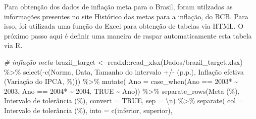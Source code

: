 \documentclass[
]{article}
\newenvironment{Shaded}{\begin{snugshade}}{\end{snugshade}}
\newcommand{\AttributeTok}[1]{\textcolor[rgb]{0.77,0.63,0.00}{#1}}
\newcommand{\CommentTok}[1]{\textcolor[rgb]{0.56,0.35,0.01}{\textit{#1}}}
\newcommand{\ConstantTok}[1]{\textcolor[rgb]{0.00,0.00,0.00}{#1}}
\newcommand{\FunctionTok}[1]{\textcolor[rgb]{0.00,0.00,0.00}{#1}}
\newcommand{\NormalTok}[1]{#1}
\newcommand{\OtherTok}[1]{\textcolor[rgb]{0.56,0.35,0.01}{#1}}
\newcommand{\SpecialCharTok}[1]{\textcolor[rgb]{0.00,0.00,0.00}{#1}}
\newcommand{\StringTok}[1]{\textcolor[rgb]{0.31,0.60,0.02}{#1}}
\begin{document}
Para obtenção dos dados de inflação meta para o Brasil, foram utilzadas
as informações presentes no site
\href{https://www.bcb.gov.br/controleinflacao/historicometas}{Histórico
das metas para a inflação}, do BCB. Para isso, foi utilizada uma função
do Excel para obtenção de tabelas via HTML. O próximo passo aqui é
definir uma maneira de raspar automaticamente esta tabela via R.

\begin{Shaded}
\begin{Highlighting}[]
\CommentTok{\# inflação meta}
\NormalTok{brazil\_target }\OtherTok{\textless{}{-}}\NormalTok{ readxl}\SpecialCharTok{::}\FunctionTok{read\_xlsx}\NormalTok{(}\StringTok{\textquotesingle{}Dados/brazil\_target.xlsx\textquotesingle{}}\NormalTok{) }\SpecialCharTok{\%\textgreater{}\%} 
  \FunctionTok{select}\NormalTok{(}\SpecialCharTok{{-}}\FunctionTok{c}\NormalTok{(Norma, Data, }
            \StringTok{\textasciigrave{}}\AttributeTok{Tamanho do intervalo +/{-} (p.p.)}\StringTok{\textasciigrave{}}\NormalTok{, }\StringTok{\textasciigrave{}}\AttributeTok{Inflação efetiva (Variação do IPCA, \%)}\StringTok{\textasciigrave{}}\NormalTok{)) }\SpecialCharTok{\%\textgreater{}\%} 
  \FunctionTok{mutate}\NormalTok{(}
    \AttributeTok{Ano =} \FunctionTok{case\_when}\NormalTok{(Ano }\SpecialCharTok{==} \StringTok{\textquotesingle{}2003*\textquotesingle{}} \SpecialCharTok{\textasciitilde{}} \StringTok{\textquotesingle{}2003\textquotesingle{}}\NormalTok{,}
\NormalTok{              Ano }\SpecialCharTok{==} \StringTok{\textquotesingle{}2004*\textquotesingle{}} \SpecialCharTok{\textasciitilde{}} \StringTok{\textquotesingle{}2004\textquotesingle{}}\NormalTok{,}
              \ConstantTok{TRUE} \SpecialCharTok{\textasciitilde{}}\NormalTok{ Ano)) }\SpecialCharTok{\%\textgreater{}\%} 
  \FunctionTok{separate\_rows}\NormalTok{(}\StringTok{\textasciigrave{}}\AttributeTok{Meta (\%)}\StringTok{\textasciigrave{}}\NormalTok{, }\StringTok{\textasciigrave{}}\AttributeTok{Intervalo de tolerância (\%)}\StringTok{\textasciigrave{}}\NormalTok{, }\AttributeTok{convert =} \ConstantTok{TRUE}\NormalTok{, }\AttributeTok{sep =} \StringTok{\textquotesingle{}}\SpecialCharTok{\textbackslash{}n}\StringTok{\textquotesingle{}}\NormalTok{) }\SpecialCharTok{\%\textgreater{}\%} 
  \FunctionTok{separate}\NormalTok{( }
    \AttributeTok{col =} \StringTok{\textasciigrave{}}\AttributeTok{Intervalo de tolerância (\%)}\StringTok{\textasciigrave{}}\NormalTok{, }
    \AttributeTok{into =} \FunctionTok{c}\NormalTok{(}\StringTok{\textquotesingle{}inferior\textquotesingle{}}\NormalTok{, }\StringTok{\textquotesingle{}superior\textquotesingle{}}\NormalTok{), }

\end{Highlighting}
\end{Shaded}
\end{document}
